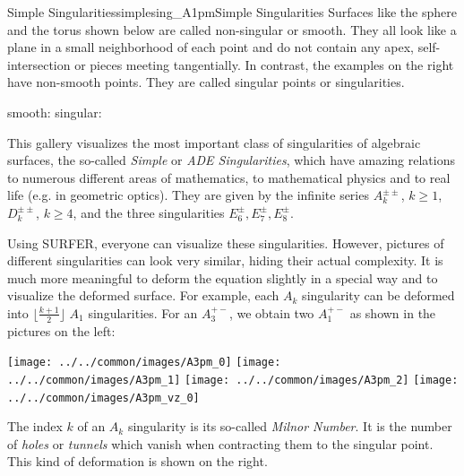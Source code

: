 \begin{surferIntroPage}{Simple Singularities}{simplesing_A1pm}{Simple Singularities}
	Surfaces like the sphere and the torus shown below are called non-singular or smooth. They all look like a plane in a small neighborhood of each point and do not contain any apex, self-intersection or pieces meeting tangentially. In contrast, the examples on the right have non-smooth points. They are called singular points or singularities.
	\begin{center}%
		smooth:\enspace%
		\quad%
		singular:%
	\end{center}
	This gallery visualizes the most important class of singularities of algebraic surfaces, the so-called \emph{Simple} or \emph{ADE Singularities}, which have amazing relations to numerous different areas of mathematics, to mathematical physics and to real life (e.g. in geometric optics). They are given by the infinite series $A_k^{\pm\pm}\!$, $k\geq 1$, $D_k^{\pm\pm}\!$, $k\geq 4$, and the three singularities $E^\pm_6\!, E^\pm_7\!, E^\pm_8\!$.

	Using SURFER, everyone can visualize these singularities. However, pictures of different singularities can look very similar, hiding their actual complexity. It is much more meaningful to deform the equation slightly in a special way and to visualize the deformed surface. For example, each $A_k$ singularity can be deformed into $\lfloor\frac{k+1}{2}\rfloor$ $A_1$ singularities. For an $A_3^{+-}$, we obtain two $A_1^{+-}$ as shown in the pictures on the left:
	\vspace{-0.2cm}
	\begin{center}%
		\texttt{[image: ../../common/images/A3pm\_0]}\enspace%
		\texttt{[image: ../../common/images/A3pm\_1]}\enspace%
		\texttt{[image: ../../common/images/A3pm\_2]}\enspace%
		\qquad\quad%
		\enspace%
		\enspace%
		\texttt{[image: ../../common/images/A3pm\_vz\_0]}
	\end{center}
	\vspace{-0.2cm}
	The index $k$ of an $A_k$ singularity is its so-called \emph{Milnor Number}. It is the number of \emph{holes} or \emph{tunnels} which vanish when contracting them to the singular point. This kind of deformation is shown on the right.
\end{surferIntroPage}
